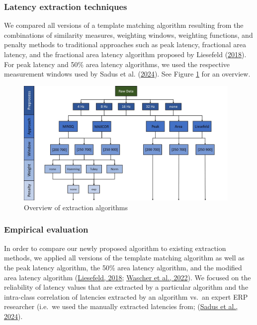 \documentclass[
  man]{apa7}
\begin{document}
\hypertarget{latency-extraction-techniques}{%
\subsubsection{Latency extraction techniques}\label{latency-extraction-techniques}}

We compared all versions of a template matching algorithm resulting from the combinations of similarity measures, weighting windows, weighting functions, and penalty methods to traditional approaches such as peak latency, fractional area latency, and the fractional area latency algorithm proposed by Liesefeld (\protect\hyperlink{ref-liesefeld2018estimating}{2018}). For peak latency and 50\% area latency algorithms, we used the respective measurement windows used by Sadus et al. (\protect\hyperlink{ref-sadus2024explorative}{2024}). See Figure \ref{fig:method-overview-img} for an overview.



\begin{figure}
\includegraphics[width=4.27in]{../images/method_overview} \caption{Overview of extraction algorithms}\label{fig:method-overview-img}
\end{figure}

\hypertarget{empirical-evaluation}{%
\subsubsection{Empirical evaluation}\label{empirical-evaluation}}

In order to compare our newly proposed algorithm to existing extraction methods, we applied all versions of the template matching algorithm as well as the peak latency algorithm, the 50\% area latency algorithm, and the modified area latency algorithm (\protect\hyperlink{ref-liesefeld2018estimating}{Liesefeld, 2018}; \protect\hyperlink{ref-wascher2022mental}{Wascher et al., 2022}). We focused on the reliability of latency values that are extracted by a particular algorithm and the intra-class correlation of latencies extracted by an algorithm vs.~an expert ERP researcher (i.e.~we used the manually extracted latencies from; (\protect\hyperlink{ref-sadus2024explorative}{Sadus et al., 2024}).
\end{document}
